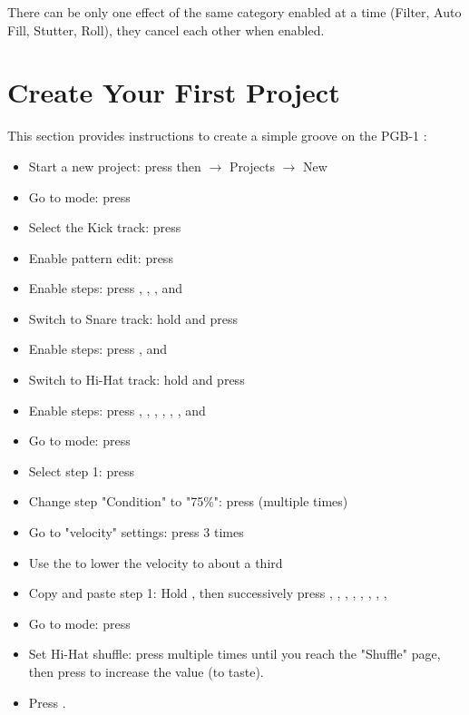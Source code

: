 \documentclass[8pt]{extarticle}
\def\device{PGB-1 }
\begin{document}
\begin{multicols*}{3}
There can be only one effect of the same category enabled at a time (Filter, Auto Fill, Stutter, Roll), they cancel each other when enabled.

\section{Create Your First Project}

This section provides instructions to create a simple groove on the \device:
\begin{itemize}
   \item Start a new project: press  then $\rightarrow$ Projects $\rightarrow$ New
   \item Go to  mode: press 
   \item Select the Kick track: press 
   \item Enable pattern edit: press 
   \item Enable steps: press , , , and 
   \item Switch to Snare track: hold  and press 
   \item Enable steps: press , and 
   \item Switch to Hi-Hat track: hold  and press 
   \item Enable steps: press , , , , , , and 
   \item Go to  mode: press 
   \item Select step 1: press 
   \item Change step "Condition" to "75\%": press  (multiple times)
   \item Go to "velocity" settings: press  3 times
   \item Use the  to lower the velocity to about a third
   \item Copy and paste step 1: Hold , then successively press , , , , , , , , 
   \item Go to  mode: press 
   \item Set Hi-Hat shuffle: press  multiple times until you reach the "Shuffle" page, then press  to increase the value (to taste).
   \item Press .
\end{itemize}


\end{multicols*}
\end{document}
